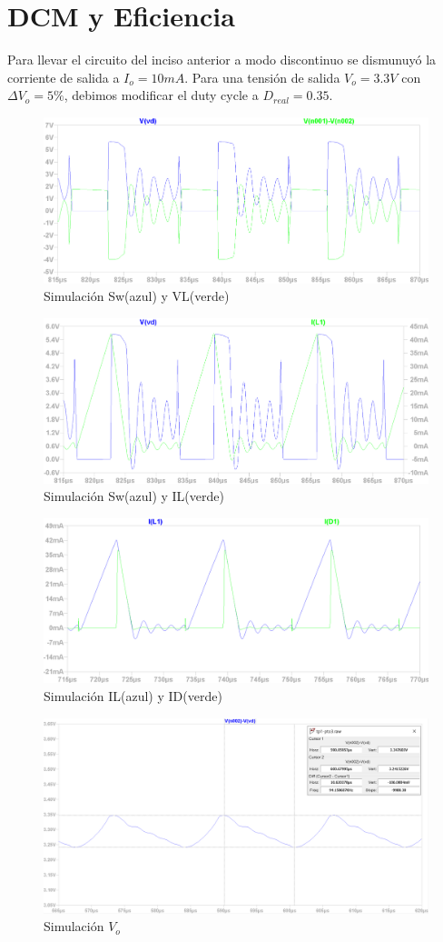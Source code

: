 \documentclass[e4_tp1_main.tex]{subfiles}
\begin{document}
\section{DCM y Eficiencia}


Para llevar el circuito del inciso anterior a modo discontinuo se dismunuy\'o la corriente de salida a $I_o=10mA$.  Para una tensi\'on de salida $V_o=3.3V$ con $\Delta V_o =5\%$, debimos modificar el duty cycle a $D_{real}=0.35$.

\begin{figure}[H]
\centering
\includegraphics[width=0.7\linewidth]{Imagenes/Punto4/SW&VL}
\caption{Simulación Sw(azul) y VL(verde)}
\end{figure}

\begin{figure}[H]
\centering
\includegraphics[width=0.7\linewidth]{Imagenes/Punto4/SW&IL}
\caption{Simulación Sw(azul) y IL(verde)}
\end{figure}

\begin{figure}[H]
\centering
\includegraphics[width=0.7\linewidth]{Imagenes/Punto4/IL&ID}
\caption{Simulación IL(azul) y ID(verde)}
\end{figure}

\begin{figure}[H]
\centering
\includegraphics[width=0.7\linewidth]{Imagenes/Punto4/Vo-D=0,35.PNG}
\caption{Simulación $V_o$}
\end{figure}




\newpage
\end{document}
